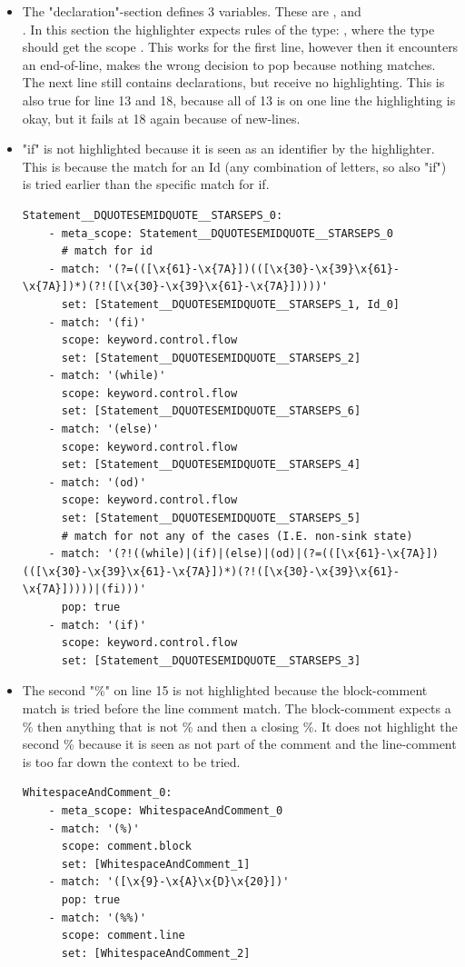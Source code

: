 \begin{itemize}
\item The "declaration"-section defines 3 variables. These are ,  and\\ . In this section the highlighter expects rules of the type: , where the type should get the scope . This works for the first line, however then it encounters an end-of-line, makes the wrong decision to pop because nothing matches. The next line still contains declarations, but receive no highlighting. This is also true for line 13 and 18, because all of 13 is on one line the highlighting is okay, but it fails at 18 again because of new-lines.\pagebreak
\item "if" is not highlighted because it is seen as an identifier by the highlighter. This is because the match for an Id (any combination of letters, so also "if") is tried earlier than the specific match for if.\\
\begin{lstlisting}[language=SublimeSyntax]
  Statement__DQUOTESEMIDQUOTE__STARSEPS_0:
    - meta_scope: Statement__DQUOTESEMIDQUOTE__STARSEPS_0
      # match for id
    - match: '(?=(([\x{61}-\x{7A}])(([\x{30}-\x{39}\x{61}-\x{7A}])*)(?!([\x{30}-\x{39}\x{61}-\x{7A}]))))'
      set: [Statement__DQUOTESEMIDQUOTE__STARSEPS_1, Id_0]
    - match: '(fi)'
      scope: keyword.control.flow
      set: [Statement__DQUOTESEMIDQUOTE__STARSEPS_2]
    - match: '(while)'
      scope: keyword.control.flow
      set: [Statement__DQUOTESEMIDQUOTE__STARSEPS_6]
    - match: '(else)'
      scope: keyword.control.flow
      set: [Statement__DQUOTESEMIDQUOTE__STARSEPS_4]
    - match: '(od)'
      scope: keyword.control.flow
      set: [Statement__DQUOTESEMIDQUOTE__STARSEPS_5]
      # match for not any of the cases (I.E. non-sink state)
    - match: '(?!((while)|(if)|(else)|(od)|(?=(([\x{61}-\x{7A}])(([\x{30}-\x{39}\x{61}-\x{7A}])*)(?!([\x{30}-\x{39}\x{61}-\x{7A}]))))|(fi)))'
      pop: true
    - match: '(if)'
      scope: keyword.control.flow
      set: [Statement__DQUOTESEMIDQUOTE__STARSEPS_3]
\end{lstlisting}
\item The second "\%" on line 15 is not highlighted because the block-comment match is tried before the line comment match. The block-comment expects a \% then anything that is not \% and then a closing \%. It does not highlight the second \% because it is seen as not part of the comment and the line-comment is too far down the context to be tried.
\begin{lstlisting}[language=SublimeSyntax]
  WhitespaceAndComment_0:
    - meta_scope: WhitespaceAndComment_0
    - match: '(%)'
      scope: comment.block
      set: [WhitespaceAndComment_1]
    - match: '([\x{9}-\x{A}\x{D}\x{20}])'
      pop: true
    - match: '(%%)'
      scope: comment.line
      set: [WhitespaceAndComment_2]
\end{lstlisting}
\end{itemize}


